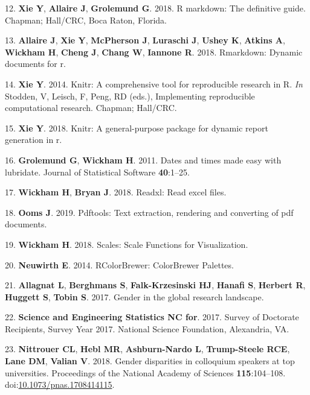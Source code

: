 \documentclass[10pt,]{article}
\begin{document}
\hypertarget{ref-rmd_book}{}
12. \textbf{Xie Y}, \textbf{Allaire J}, \textbf{Grolemund G}. 2018. R
markdown: The definitive guide. Chapman; Hall/CRC, Boca Raton, Florida.

\hypertarget{ref-rmd_rstudio}{}
13. \textbf{Allaire J}, \textbf{Xie Y}, \textbf{McPherson J},
\textbf{Luraschi J}, \textbf{Ushey K}, \textbf{Atkins A},
\textbf{Wickham H}, \textbf{Cheng J}, \textbf{Chang W}, \textbf{Iannone
R}. 2018. Rmarkdown: Dynamic documents for r.

\hypertarget{ref-knitr_2014}{}
14. \textbf{Xie Y}. 2014. Knitr: A comprehensive tool for reproducible
research in R. \emph{In} Stodden, V, Leisch, F, Peng, RD (eds.),
Implementing reproducible computational research. Chapman; Hall/CRC.

\hypertarget{ref-knitr_2018}{}
15. \textbf{Xie Y}. 2018. Knitr: A general-purpose package for dynamic
report generation in r.

\hypertarget{ref-lubridate}{}
16. \textbf{Grolemund G}, \textbf{Wickham H}. 2011. Dates and times made
easy with lubridate. Journal of Statistical Software \textbf{40}:1--25.

\hypertarget{ref-readxl}{}
17. \textbf{Wickham H}, \textbf{Bryan J}. 2018. Readxl: Read excel
files.

\hypertarget{ref-pdftools}{}
18. \textbf{Ooms J}. 2019. Pdftools: Text extraction, rendering and
converting of pdf documents.

\hypertarget{ref-wickham_scales_2018}{}
19. \textbf{Wickham H}. 2018. Scales: Scale Functions for Visualization.

\hypertarget{ref-neuwirth_rcolorbrewer_2014}{}
20. \textbf{Neuwirth E}. 2014. RColorBrewer: ColorBrewer Palettes.

\hypertarget{ref-allagnat_gender_2017}{}
21. \textbf{Allagnat L}, \textbf{Berghmans S}, \textbf{Falk-Krzesinski
HJ}, \textbf{Hanafi S}, \textbf{Herbert R}, \textbf{Huggett S},
\textbf{Tobin S}. 2017. Gender in the global research landscape.

\hypertarget{ref-nsf_survey_2017}{}
22. \textbf{Science and Engineering Statistics NC for}. 2017. Survey of
Doctorate Recipients, Survey Year 2017. National Science Foundation,
Alexandria, VA.

\hypertarget{ref-nittrouer_gender_2018}{}
23. \textbf{Nittrouer CL}, \textbf{Hebl MR}, \textbf{Ashburn-Nardo L},
\textbf{Trump-Steele RCE}, \textbf{Lane DM}, \textbf{Valian V}. 2018.
Gender disparities in colloquium speakers at top universities.
Proceedings of the National Academy of Sciences \textbf{115}:104--108.
doi:\href{https://doi.org/10.1073/pnas.1708414115}{10.1073/pnas.1708414115}.
\end{document}
